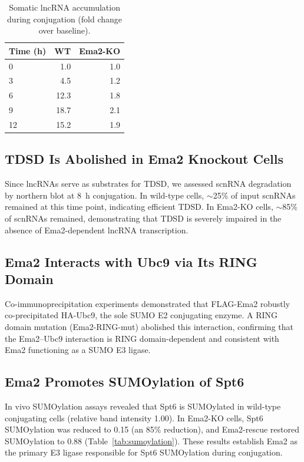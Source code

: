 \documentclass[11pt]{article}
\begin{document}
\begin{table}[ht]
\centering
\caption{Somatic lncRNA accumulation during conjugation (fold change over baseline).}
\label{tab:lncrna}
\begin{tabular}{lrr}
\toprule
\textbf{Time (h)} & \textbf{WT} & \textbf{Ema2-KO} \\
\midrule
0 & 1.0 & 1.0 \\
3 & 4.5 & 1.2 \\
6 & 12.3 & 1.8 \\
9 & 18.7 & 2.1 \\
12 & 15.2 & 1.9 \\
\bottomrule
\end{tabular}
\end{table}

\subsection{TDSD Is Abolished in Ema2 Knockout Cells}

Since lncRNAs serve as substrates for TDSD, we assessed scnRNA degradation by northern blot at 8~h conjugation. In wild-type cells, $\sim$25\% of input scnRNAs remained at this time point, indicating efficient TDSD. In Ema2-KO cells, $\sim$85\% of scnRNAs remained, demonstrating that TDSD is severely impaired in the absence of Ema2-dependent lncRNA transcription.

\subsection{Ema2 Interacts with Ubc9 via Its RING Domain}

Co-immunoprecipitation experiments demonstrated that FLAG-Ema2 robustly co-precipitated HA-Ubc9, the sole SUMO E2 conjugating enzyme. A RING domain mutation (Ema2-RING-mut) abolished this interaction, confirming that the Ema2--Ubc9 interaction is RING domain-dependent and consistent with Ema2 functioning as a SUMO E3 ligase.

\subsection{Ema2 Promotes SUMOylation of Spt6}

In vivo SUMOylation assays revealed that Spt6 is SUMOylated in wild-type conjugating cells (relative band intensity 1.00). In Ema2-KO cells, Spt6 SUMOylation was reduced to 0.15 (an 85\% reduction), and Ema2-rescue restored SUMOylation to 0.88 (Table~\ref{tab:sumoylation}). These results establish Ema2 as the primary E3 ligase responsible for Spt6 SUMOylation during conjugation.
\end{document}
